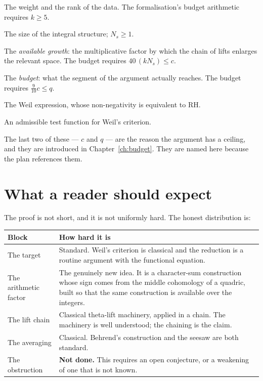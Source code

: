 \begin{description}[style=nextline,leftmargin=0pt,labelwidth=0pt,labelsep=0pt,font=\sffamily\bfseries\small,
  itemsep=6pt]
\item[$m$, $k$] The weight and the rank of the data. The formalisation's
budget arithmetic requires $k \ge 5$.
\item[$N_s$] The size of the integral structure; $N_s \ge 1$.
\item[$c$] The \emph{available growth}: the multiplicative factor by which the
chain of lifts enlarges the relevant space. The budget requires
$40\,(kN_s) \le c$.
\item[$q$] The \emph{budget}: what the segment of the argument actually
reaches. The budget requires $\tfrac{9}{10}c \le q$.
\item[$W$] The Weil expression, whose non-negativity is equivalent to RH.
\item[$g$] An admissible test function for Weil's criterion.
\end{description}

The last two of these --- $c$ and $q$ --- are the reason the argument has a
ceiling, and they are introduced in Chapter~\ref{ch:budget}. They are named
here because the plan references them.

\section{What a reader should expect}

The proof is not short, and it is not uniformly hard. The honest distribution
is:

\begin{center}
\begin{tabular}{@{}>{\RaggedRight\arraybackslash\hyphenpenalty=10000\exhyphenpenalty=10000}p{}>{\RaggedRight\arraybackslash\hyphenpenalty=10000\exhyphenpenalty=10000}p{}@{}}
\toprule
\textbf{Block} & \textbf{How hard it is} \\
\midrule
The target & Standard. Weil's criterion is classical and the reduction is a
routine argument with the functional equation. \\
The arithmetic factor & The genuinely new idea. It is a character-sum
construction whose sign comes from the middle cohomology of a quadric, built
so that the same construction is available over the integers. \\
The lift chain & Classical theta-lift machinery, applied in a chain. The
machinery is well understood; the chaining is the claim. \\
The averaging & Classical. Behrend's construction and the seesaw are both
standard. \\
The obstruction & \textbf{Not done.} This requires an open conjecture, or a
weakening of one that is not known. \\
\bottomrule
\end{tabular}
\end{center}

